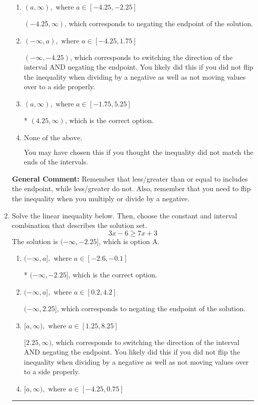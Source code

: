 \documentclass{extbook}[14pt]
\newcommand{\litem}[1]{\item #1

\rule{\textwidth}{0.4pt}}
\begin{document}
\begin{enumerate}
{\begin{enumerate}[label=\Alph*.]
 $(-\infty, 4.25)$, which corresponds to switching the direction of the interval. You likely did this if you did not flip the inequality when dividing by a negative!
\item \( (a, \infty), \text{ where } a \in [-4.25, -2.25] \)

 $(-4.25, \infty)$, which corresponds to negating the endpoint of the solution.
\item \( (-\infty, a), \text{ where } a \in [-4.25, 1.75] \)

 $(-\infty, -4.25)$, which corresponds to switching the direction of the interval AND negating the endpoint. You likely did this if you did not flip the inequality when dividing by a negative as well as not moving values over to a side properly.
\item \( (a, \infty), \text{ where } a \in [-1.75, 5.25] \)

* $(4.25, \infty)$, which is the correct option.
\item \( \text{None of the above}. \)

You may have chosen this if you thought the inequality did not match the ends of the intervals.
\end{enumerate}

\textbf{General Comment:} Remember that less/greater than or equal to includes the endpoint, while less/greater do not. Also, remember that you need to flip the inequality when you multiply or divide by a negative.
}
\litem{
Solve the linear inequality below. Then, choose the constant and interval combination that describes the solution set.
\[ 3x -6 \geq 7x + 3 \]The solution is \( (-\infty, -2.25] \), which is option A.\begin{enumerate}[label=\Alph*.]
\item \( (-\infty, a], \text{ where } a \in [-2.6, -0.1] \)

* $(-\infty, -2.25]$, which is the correct option.
\item \( (-\infty, a], \text{ where } a \in [0.2, 4.2] \)

 $(-\infty, 2.25]$, which corresponds to negating the endpoint of the solution.
\item \( [a, \infty), \text{ where } a \in [1.25, 8.25] \)

 $[2.25, \infty)$, which corresponds to switching the direction of the interval AND negating the endpoint. You likely did this if you did not flip the inequality when dividing by a negative as well as not moving values over to a side properly.
\item \( [a, \infty), \text{ where } a \in [-4.25, 0.75] \)


\end{enumerate}}
\end{enumerate}
\end{document}
